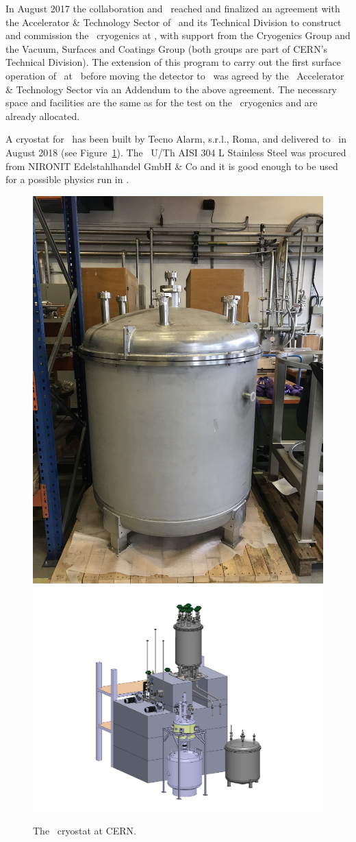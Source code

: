 In August 2017 the collaboration and \LNGS\ reached and finalized an agreement \cite{Mapelli:2017vn} with the Accelerator \& Technology Sector of \CERN\ and its Technical Division to construct and commission the \DSks\ cryogenics at \CERN, with support from the Cryogenics Group and the Vacuum, Surfaces and Coatings Group (both groups are part of CERN's Technical Division). The extension of this program to carry out the first surface operation of \DSps\ at \CERN\ before moving the detector to \LNGS\ was agreed by the \CERN\ Accelerator \& Technology Sector via an Addendum to the above agreement. The necessary space and facilities are the same as for the test on the \DSk\ cryogenics and are already allocated.

A cryostat for \DSps\ has been built by Tecno Alarm, s.r.l., Roma, and delivered to \CERN\ in August 2018 (see Figure~\ref{fig:proto-cern}).  The \DSlCryostatUCont\ U/Th AISI 304 L Stainless Steel was procured from NIRONIT Edelstahlhandel GmbH \& Co and it is good enough to be used for a possible physics run in \LNGS.

\begin{figure}[!t]
\centering
\includegraphics[width=0.43\columnwidth]{./Figures/Proto1t_Cryostat.jpg}
\includegraphics[width=0.55\columnwidth]{./Figures/Cryogenics-Test-Layout-crop.pdf}
\caption[The \DSps\ cryostat at \CERN]{The \DSps\ cryostat  at CERN.}
\label{fig:proto-cern}
\end{figure}

